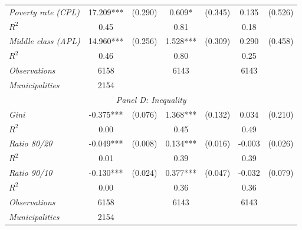 \begin{tabular}{lcccccc}
\textit{Poverty rate (CPL)}          &  17.209***    & (0.290)      &   0.609*        &  (0.345)      &     0.135  &    (0.526)   \\
$R^{2}$			           	   &  0.45   & 	   &     0.81   	&		 &     0.18   &  \\

\textit{Middle class (APL)}          &  14.960***    & (0.256)      &   1.528***        &  (0.309)      &     0.290  &    (0.458)   \\
$R^{2}$			           	   &  0.46   & 	   &     0.80   	&		 &     0.25   &  \\


\textit{Observations}                 &   6158    &        & 6143    &  &  6143   &  		\\
\textit{Municipalities}               &   2154   &        &    &  &    &  		\\
\hline		


\multicolumn{7}{c}{\textit{Panel D: Inequality}} \\


\textit{Gini}          &  -0.375***    & (0.076)      &   1.368***        &  (0.132)      &     0.034  &    (0.210)   \\
$R^{2}$			           	   &  0.00   & 	   &     0.45   	&		 &     0.49   &  \\

\textit{Ratio 80/20}          &  -0.049***    & (0.008)      &   0.134***        &  (0.016)      &     -0.003  &    (0.026)   \\
$R^{2}$			           	   &  0.01   & 	   &     0.39   	&		 &     0.39   &  \\
		
\textit{Ratio 90/10}          &  -0.130***    & (0.024)      &   0.377***        &  (0.047)      &     -0.032  &    (0.079)   \\
$R^{2}$			           	   &  0.00   & 	   &     0.36   	&		 &     0.36   &  \\


\textit{Observations}                 &   6158    &        & 6143    &  &  6143   &  		\\
\textit{Municipalities}               &   2154   &        &    &  &    &  		\\

\bottomrule
\end{tabular}%
